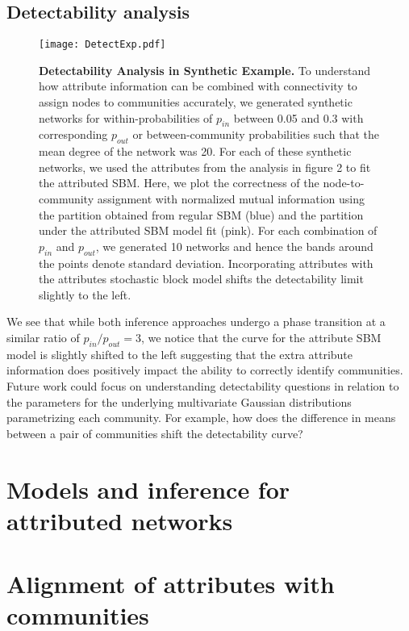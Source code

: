 \subsection{Detectability analysis}
\begin{figure}[h!]
\begin{center}
\texttt{[image: DetectExp.pdf]}
\caption{{\bf Detectability Analysis in Synthetic Example.} To understand how attribute information can be combined with connectivity to assign nodes to communities accurately, we generated synthetic networks for within-probabilities of $p_{in}$ between 0.05 and 0.3 with corresponding $p_{out}$ or between-community probabilities such that the mean degree of the network was 20. For each of these synthetic networks, we used the attributes from the analysis in figure 2 to fit the attributed SBM. Here, we plot the correctness of the node-to-community assignment with normalized mutual information using the partition obtained from regular SBM (blue) and the partition under the attributed SBM model fit (pink). For each combination of $p_{in}$ and $p_{out}$, we generated 10 networks and hence the bands around the points denote standard deviation. Incorporating attributes with the attributes stochastic block model shifts the detectability limit slightly to the left. }
\label{Att:Detect}
\end{center}
\end{figure}

We see that while both inference approaches undergo a phase transition at a similar ratio of $p_{in}/p_{out}=3$, we notice that the curve for the attribute SBM model is slightly shifted to the left suggesting that the extra attribute information does positively impact the ability to correctly identify communities. Future work could focus on understanding detectability questions in relation to the parameters for the underlying multivariate Gaussian distributions parametrizing each community. For example, how does the difference in means between a pair of communities shift the detectability curve?



\section{Models and inference for attributed networks}
\section{Alignment of attributes with communities}
